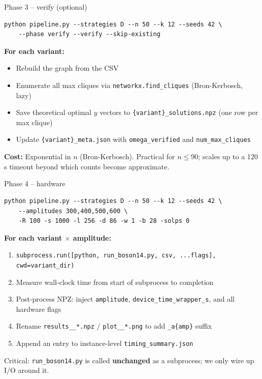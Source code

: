 \documentclass[aspectratio=169]{beamer}
\begin{document}

\begin{frame}[fragile]{Phase 3 -- verify (optional)}
\begin{lstlisting}[style=shell,numbers=none]
python pipeline.py --strategies D --n 50 --k 12 --seeds 42 \
    --phase verify --verify --skip-existing
\end{lstlisting}

    \textbf{For each variant:}
    \begin{itemize}
        \item Rebuild the graph from the CSV
        \item Enumerate all max cliques via \texttt{networkx.find\_cliques} (Bron-Kerbosch, lazy)
        \item Save theoretical optimal $y$ vectors to \texttt{\{variant\}\_solutions.npz} (one row per max clique)
        \item Update \texttt{\{variant\}\_meta.json} with \texttt{omega\_verified} and \texttt{num\_max\_cliques}
    \end{itemize}

    \vspace{0.5em}
    \textbf{Cost:} Exponential in $n$ (Bron-Kerbosch). Practical for $n \leq 90$; scales up to a 120\,s timeout beyond which counts become approximate.
\end{frame}


\begin{frame}[fragile]{Phase 4 -- hardware}
\begin{lstlisting}[style=shell,numbers=none]
python pipeline.py --strategies D --n 50 --k 12 --seeds 42 \
    --amplitudes 300,400,500,600 \
    -R 100 -s 1000 -l 256 -d 86 -w 1 -b 28 -solps 0
\end{lstlisting}

    \textbf{For each variant $\times$ amplitude:}
    \begin{enumerate}
        \item \texttt{subprocess.run([python, run\_boson14.py, csv, ...flags], cwd=variant\_dir)}
        \item Measure wall-clock time from start of subprocess to completion
        \item Post-process NPZ: inject \texttt{amplitude}, \texttt{device\_time\_wrapper\_s}, and all hardware flags
        \item Rename \texttt{results\_\_*.npz} / \texttt{plot\_\_*.png} to add \texttt{\_a\{amp\}} suffix
        \item Append an entry to instance-level \texttt{timing\_summary.json}
    \end{enumerate}

    \vspace{0.5em}
    \alert{Critical:} \texttt{run\_boson14.py} is called \textbf{unchanged} as a subprocess; we only wire up I/O around it.
\end{frame}
\end{document}
